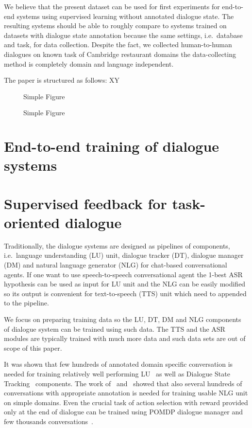 \documentclass[runningheads,a4paper]{llncs}
\begin{document}
We believe that the present dataset can be used for first experiments for end-to-end systems using supervised learning without annotated dialogue state.
The resulting systems should be able to roughly compare to systems trained on datasets with \cite{dstsc2, dstc3} dialogue state annotation because the same settings, i.e.\ database and task, for data collection.
Despite the fact, we collected human-to-human dialogues on known task of Cambridge restaurant domains the data-collecting method is completely domain and language independent.

The paper is structured as follows:
XY



\begin{figure}
Simple Figure
\caption{Simple Figure}
\label{fig:simple}
\end{figure}



\section{End-to-end training of dialogue systems}
\label{sec:training}

\section{Supervised feedback for task-oriented dialogue}
\label{sec:repre}
Traditionally, the dialogue systems are designed as pipelines of components, i.e.\ language understanding (LU) unit, dialogue tracker (DT), dialogue manager (DM) and natural language generator (NLG) for chat-based conversational agents.
If one want to use speech-to-speech conversational agent the 1-best ASR hypothesis can be used as input for LU unit and the NLG can be easily modified so its output is convenient for text-to-speech (TTS) unit which need to appended to the pipeline.

We focus on preparing training data so the LU, DT, DM and NLG components of dialogue system can be trained using such data.
The TTS and the ASR modules are typically trained with much more data and such data sets are out of scope of this paper.

It was shown that few hundreds of annotated domain specific conversation is needed for training relatively well performing LU~\cite{Alex} as well as Dialogue State Tracking~\cite{todo-Young?} components.
The work of~\cite{dusek} and~\cite{Marraise} showed that also several hundreds of conversations with appropriate annotation is needed for training usable NLG unit on simple domains.
Even the crucial task of action selection with reward provided only at the end of dialogue can be trained using POMDP dialogue manager and few thousands conversations~\cite{Gasic}.
\end{document}
